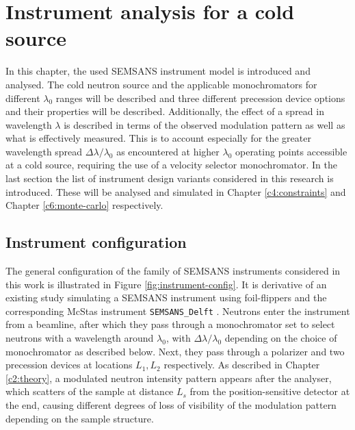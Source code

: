\documentclass{article}
\begin{document}
\section{Instrument analysis for a cold source}
\label{c3}
In this chapter, the used SEMSANS instrument model is introduced and analysed. The cold neutron source and the applicable monochromators for different $\lambda_0$ ranges will be described and three different precession device options and their properties will be described. Additionally, the effect of a spread in wavelength $\lambda$ is described in terms of the observed modulation pattern as well as what is effectively measured. This is to account especially for the greater wavelength spread $\Delta\lambda/\lambda_0$ as encountered at higher $\lambda_0$ operating points accessible at a cold source, requiring the use of a velocity selector monochromator. In the last section the list of instrument design variants considered in this research is introduced. These will be analysed and simulated in Chapter \ref{c4:constraints} and Chapter \ref{c6:monte-carlo} respectively. 

\subsection{Instrument configuration}
\label{c3.1}
The general configuration of the family of SEMSANS instruments considered in this work is illustrated in Figure \ref{fig:instrument-config}. It is derivative of an existing study simulating a SEMSANS instrument using foil-flippers and the corresponding McStas instrument \texttt{SEMSANS\_Delft} \cite{bouwman2021b}. Neutrons enter the instrument from a beamline, after which they pass through a monochromator set to select neutrons with a wavelength around $\lambda_0$, with  $\Delta\lambda/\lambda_0$ depending on the choice of monochromator as described below. Next, they pass through a polarizer and two precession devices at locations $L_1, L_2$ respectively. As described in Chapter \ref{c2:theory}, a modulated neutron intensity pattern appears after the analyser, which scatters of the sample at distance $L_s$ from the position-sensitive detector at the end, causing different degrees of loss of visibility of the modulation pattern depending on the sample structure. 
\end{document}
